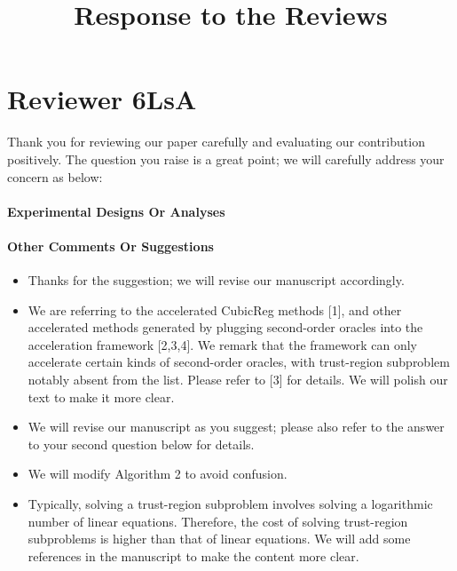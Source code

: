 \documentclass{article}
\title{Response to the Reviews}
\begin{document}
\maketitle
\section{Reviewer 6LsA}
Thank you for reviewing our paper carefully and evaluating our contribution positively. The question you raise is a great point; we will carefully address your concern as below:
\paragraph{Experimental Designs Or Analyses}

\paragraph{Other Comments Or Suggestions}
\begin{itemize}
    \item Thanks for the suggestion; we will revise our manuscript accordingly.
    \item We are referring to the accelerated CubicReg methods [1], and other accelerated methods generated by plugging second-order oracles into the acceleration framework [2,3,4]. We remark that the framework can only accelerate certain kinds of second-order oracles, with trust-region subproblem notably absent from the list. Please refer to [3] for details. We will polish our text to make it more clear.
    \item We will revise our manuscript as you suggest; please also refer to the answer to your second question below for details. 
    \item We will modify Algorithm 2 to avoid confusion.
    \item Typically, solving a trust-region subproblem involves solving a logarithmic number of linear equations. Therefore, the cost of solving trust-region subproblems is higher than that of linear equations. We will add some references in the manuscript to make the content more clear.
\end{itemize}
\end{document}
